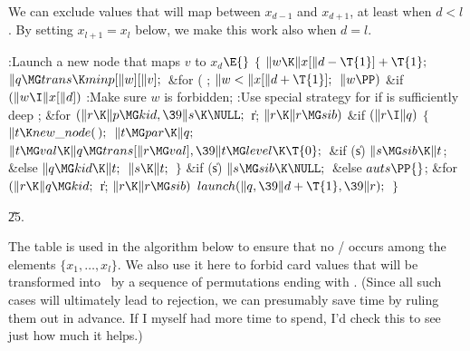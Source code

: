 We can exclude values that will map between $x_{d-1}$
and $x_{d+1}$,
at least when $d<l$. By setting $x_{l+1}=x_l$ below, we make this
work also when $d=l$.

\Y\B\4:Launch a new node that maps $v$ to $x_d$\X${}\E{}$\6
${}\{{}$\1\6
${}\|w\K\|x[\|d-\T{1}]+\T{1};{}$\6
${}\|q\MG\\{trans}\K\\{minp}[\|w][\|v];{}$\6
\&{for} ( ; ${}\|w<\|x[\|d+\T{1}];{}$ ${}\|w\PP){}$\1\6
\&{if} ${}(\|w\I\|x[\|d]){}$\1\5
:Make sure $w$ is forbidden\X;\2\2\6
:Use special strategy for  if  is sufficiently deep%
\X;\6
\&{for} ${}(\|r\K\|p\MG\\{kid},\39\|s\K\NULL;{}$ \|r; ${}\|r\K\|r\MG\\{sib}){}$%
\1\6
\&{if} ${}(\|r\I\|q){}$\5
${}\{{}$\1\6
${}\|t\K\\{new\_node}(\,);{}$\6
${}\|t\MG\\{par}\K\|q;{}$\6
${}\|t\MG\\{val}\K\|q\MG\\{trans}[\|r\MG\\{val}],\39\|t\MG\\{level}\K\T{0};{}$\6
\&{if} (\|s)\1\5
${}\|s\MG\\{sib}\K\|t{}$;\5
\2\&{else}\1\5
${}\|q\MG\\{kid}\K\|t;{}$\2\6
${}\|s\K\|t;{}$\6
\4${}\}{}$\2\2\6
\&{if} (\|s)\1\5
${}\|s\MG\\{sib}\K\NULL;{}$\2\6
\&{else}\1\5
${}\\{auts}\PP{}$;\2\6
\&{for} ${}(\|r\K\|q\MG\\{kid};{}$ \|r; ${}\|r\K\|r\MG\\{sib}){}$\1\5
${}\\{launch}(\|q,\39\|d+\T{1},\39\|r);{}$\2\6
\4${}\}{}$\2\par
\U25.\fi

The  table is used in the algorithm
below to ensure that no
\SET/ occurs among the elements $\{x_1,\ldots,x_l\}$. We also use it here
to forbid card values that will be transformed into~
by a sequence of permutations ending with . (Since all
such
cases will ultimately lead to rejection, we can presumably save time
by ruling them out in advance. If I myself had more time to spend,
I'd check this to see just how much it helps.)

